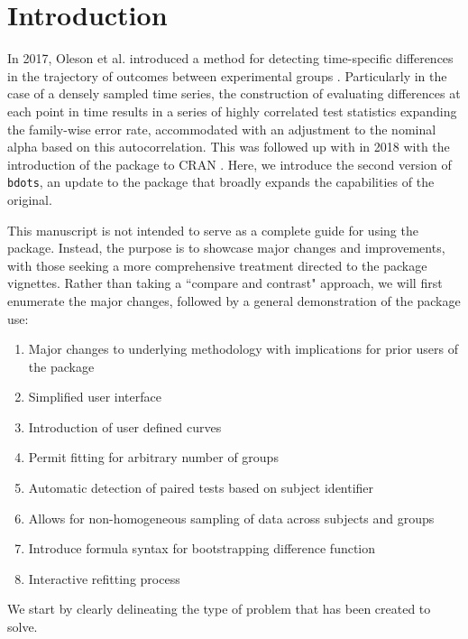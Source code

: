 \section{Introduction}



In 2017, Oleson et al. introduced a method for detecting time-specific differences in the trajectory of outcomes between experimental groups \cite{oleson2017detecting}. Particularly in the case of a densely sampled time series, the construction of evaluating differences at each point in time results in a series of highly correlated test statistics expanding the family-wise error rate, accommodated with an adjustment to the nominal alpha based on this autocorrelation. This was followed up with in 2018 with the introduction of the  package to CRAN \cite{seedorff2018bdots}. Here, we introduce the second version of \texttt{bdots}, an update to the package that broadly expands the capabilities of the original. 

This manuscript is not intended to serve as a complete guide for using the  package. Instead, the purpose is to showcase major changes and improvements, with those seeking a more comprehensive treatment directed to the package vignettes. Rather than taking a ``compare and contrast" approach, we will first enumerate the major changes, followed by a general demonstration of the package use:

\begin{singlespace}
\begin{enumerate}
\item Major changes to underlying methodology with implications for prior users of the package
\item Simplified user interface
\item Introduction of user defined curves
\item Permit fitting for arbitrary number of groups
\item Automatic detection of paired tests based on subject identifier
\item Allows for non-homogeneous sampling of data across subjects and groups
\item Introduce formula syntax for bootstrapping difference function
\item Interactive refitting process
\end{enumerate}
\end{singlespace}


We start by clearly delineating the type of problem that  has been created to solve.

